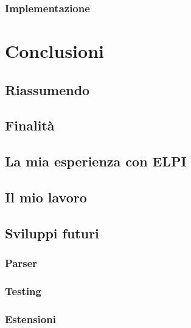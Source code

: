 \documentclass[12pt,a4paper,openright,twoside]{report}
\begin{document}
\subsection{Implementazione}

\clearpage{\pagestyle{empty}\cleardoublepage}		%


\chapter{Conclusioni}		%



\section{Riassumendo}

\section{Finalità}

\section{La mia esperienza con ELPI}

\section{Il mio lavoro}

\section{Sviluppi futuri}
\subsection{Parser}
\subsection{Testing}
\subsection{Estensioni}
\end{document}
